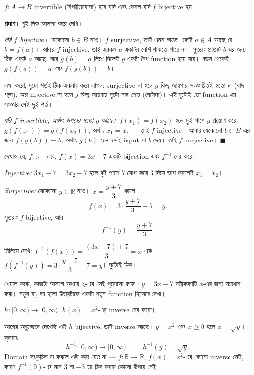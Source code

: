 \documentclass[11pt]{article}
\begin{document}
\begin{idea}[কখন বিপরীত থাকে]
$f \colon A \to B$ invertible (বিপরীতযোগ্য) হবে যদি এবং কেবল যদি $f$ bijective হয়।
\end{idea}

\noindent
\textbf{প্রমাণ।} দুই দিক আলাদা করে দেখি।

\emph{ধরি $f$ bijective।} যেকোনো $b \in B$ নাও। $f$ surjective, তাই এমন
অন্তত একটি $a \in A$ আছে যে $b=f(a)$। আবার $f$ injective, তাই এরকম $a$
একটির বেশি থাকতে পারে না। সুতরাং প্রতিটি $b$-এর জন্য ঠিক একটি $a$ আছে, আর
$g(b) = a$ লিখে দিলেই $g$ একটা বৈধ function হয়ে যায়। গড়ন থেকেই
$g(f(a)) = a$ এবং $f(g(b)) = b$।

লক্ষ করো, দুটো শর্তই ঠিক একবার করে লাগল: surjective না হলে $g$ কিছু জায়গায়
সংজ্ঞায়িতই হতো না (বাদ পড়া), আর injective না হলে $g$ কিছু জায়গায় দুটো মান
পেত (দোটানা)। এই দুটোই তো function-এর সংজ্ঞার সেই দুই শর্ত।

\emph{ধরি $f$ invertible, অর্থাৎ উপরের মতো $g$ আছে।} $f(x_1) = f(x_2)$ হলে
দুই পাশে $g$ প্রয়োগ করে $g(f(x_1)) = g(f(x_2))$, অর্থাৎ $x_1 = x_2$ ---
তাই $f$ injective। আবার যেকোনো $b \in B$-এর জন্য $f(g(b)) = b$, অর্থাৎ
$g(b)$ হলো সেই input যা $b$ দেয়। তাই $f$ surjective। $\blacksquare$

\begin{example}
দেখাও যে, $f \colon \mathbb{R} \to \mathbb{R}$, $f(x) = 3x - 7$ একটি bijection এবং $f^{-1}$ বের করো।
\end{example}

\begin{solbox}
\emph{Injective:} $3x_1 - 7 = 3x_2 - 7$ হলে দুই পাশে $7$ যোগ করে $3$ দিয়ে
ভাগ করলেই $x_1 = x_2$।

\emph{Surjective:} যেকোনো $y \in \mathbb{R}$ নাও। $x = \dfrac{y+7}{3}$ ধরলে
\[
  f(x) = 3 \cdot \frac{y+7}{3} - 7 = y .
\]
সুতরাং $f$ bijective, আর
\[
  f^{-1}(y) = \frac{y + 7}{3}.
\]

মিলিয়ে দেখি: $f^{-1}(f(x)) = \dfrac{(3x - 7) + 7}{3} = x$ এবং
$f(f^{-1}(y)) = 3 \cdot \dfrac{y+7}{3} - 7 = y$। দুটোই ঠিক।

খেয়াল করো, কাজটা আসলে অধ্যায় ২-এর সেই পুরোনো কাজ : $y = 3x - 7$
সমীকরণটি $x$-এর জন্য সমাধান করা। নতুন যা, তা হলো উত্তরটাকে একটা নতুন
function হিসেবে দেখা।
\end{solbox}

\begin{example}
$h \colon [0, \infty) \to [0, \infty)$, $h(x) = x^2$-এর inverse বের করো।
\end{example}

\begin{solbox}
আগের অনুচ্ছেদে দেখেছি এই $h$ bijective, তাই inverse আছে। $y = x^2$ এবং
$x \geq 0$ হলে $x = \sqrt{y}$। সুতরাং
\[
  h^{-1} \colon [0, \infty) \to [0, \infty), \qquad h^{-1}(y) = \sqrt{y}.
\]
Domain সংকুচিত না করলে এটা করা যেত না --- $f \colon \mathbb{R} \to \mathbb{R}$,
$f(x) = x^2$-এর কোনো inverse নেই, কারণ $f^{-1}(9)$-এর মান $3$ না $-3$ তা ঠিক
করার কোনো উপায় নেই।
\end{solbox}
\end{document}
